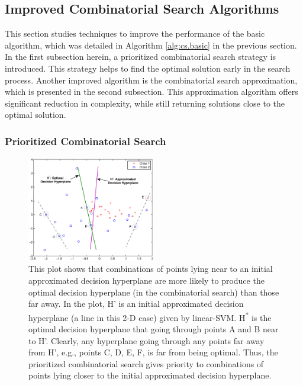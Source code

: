 \subsection{Improved Combinatorial Search Algorithms}
\label{sec:cs.improved}

This section studies techniques to improve the performance of the basic algorithm, which was detailed in Algorithm \ref{alg:cs.basic} in the previous section. In the first subsection herein, a prioritized combinatorial search strategy is introduced. This strategy helps to find the optimal solution early in the search process. Another improved algorithm is the combinatorial search approximation, which is presented in the second subsection. This approximation algorithm offers significant reduction in complexity, while still returning solutions close to the optimal solution. 

\subsubsection{Prioritized Combinatorial Search}
\label{sec:cs.prioritized}

\begin{figure}[here]
\includegraphics[width=0.50\textwidth]{images/fig42_nearfar.eps}
\caption{
This plot shows that combinations of points lying near to an initial approximated decision hyperplane are more likely to produce the optimal decision hyperplane (in the combinatorial search) than those far away. In the plot, H' is an initial approximated decision hyperplane (a line in this 2-D case) given by linear-SVM. H\textsuperscript{*} is the optimal decision hyperplane that going through points A and B near to H'. Clearly, any hyperplane going through any points far away from H', e.g., points C, D, E, F, is far from being optimal. Thus, the prioritized combinatorial search gives priority to combinations of points lying closer to the initial approximated decision hyperplane.
}
\label{fig:cs_nearfar}
\end{figure}

